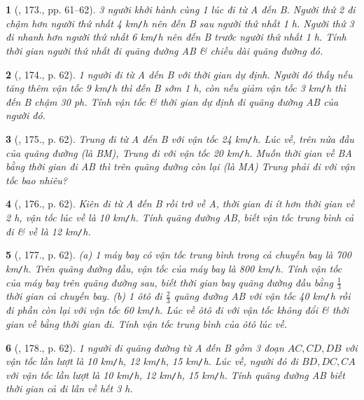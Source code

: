 \documentclass{article}
\newtheorem{baitoan}{}
\begin{document}
\begin{baitoan}[\cite{Binh_Toan_6_tap_2}, 173., pp. 61--62]
	3 người khởi hành cùng 1 lúc đi từ A đến B. Người thứ 2 đi chậm hơn người thứ nhất {\rm4 km{\tt/}h} nên đến B sau người thứ nhất {\rm1 h}. Người thứ 3 đi nhanh hơn người thứ nhất {\rm6 km{\tt/}h} nên đến B trước người thứ nhất {\rm1 h}. Tính thời gian người thứ nhất đi quãng đường AB \& chiều dài quãng đường đó.
\end{baitoan}

\begin{baitoan}[\cite{Binh_Toan_6_tap_2}, 174., p. 62]
	1 người đi từ A dến B với thời gian dự định. Người đó thấy nếu tăng thêm vận tốc {\rm9 km{\tt/}h} thì đến B sớm {\rm1 h}, còn nếu giảm vận tốc {\rm3 km{\tt/}h} thì đến B chậm {\rm30 ph}. Tính vận tốc \& thời gian dự định đi quãng đường AB của người đó.
\end{baitoan}

\begin{baitoan}[\cite{Binh_Toan_6_tap_2}, 175., p. 62]
	Trung đi từ A đến B với vận tốc {\rm24 km{\tt/}h}. Lúc về, trên nửa đầu của quãng đường (là BM), Trung đi với vận tốc {\rm20 km{\tt/}h}. Muốn thời gian về BA bằng thời gian đi AB thì trên quãng đường còn lại (là MA) Trung phải đi với vận tốc bao nhiêu?
\end{baitoan}

\begin{baitoan}[\cite{Binh_Toan_6_tap_2}, 176., p. 62]
	Kiên đi từ A đến B rồi trở về A, thời gian đi ít hơn thời gian về {\rm2 h}, vận tốc lúc về là {\rm10 km{\tt/}h}. Tính quãng đường AB, biết vận tốc trung bình cả đi \& về là {\rm12 km{\tt/}h}.
\end{baitoan}

\begin{baitoan}[\cite{Binh_Toan_6_tap_2}, 177., p. 62]
	(a) 1 máy bay có vận tốc trung bình trong cả chuyến bay là {\rm700 km{\tt/}h}. Trên quãng đường đầu, vận tốc của máy bay là {\rm800 km{\tt/}h}. Tính vận tốc của máy bay trên quãng đường sau, biết thời gian bay quãng đường đầu bằng $\frac{1}{3}$ thời gian cả chuyến bay. (b) 1 ôtô đi $\frac{2}{3}$ quãng đường AB với vận tốc {\rm40 km{\tt/}h} rồi đi phần còn lại với vận tốc {\rm60 km{\tt/}h}. Lúc về ôtô đi với vận tốc không đổi \& thời gian về bằng thời gian đi. Tính vận tốc trung bình của ôtô lúc về.
\end{baitoan}

\begin{baitoan}[\cite{Binh_Toan_6_tap_2}, 178., p. 62]
	1 người đi quãng đường từ A đến B gồm 3 đoạn $AC,CD,DB$ với vận tốc lần lượt là {\rm10 km{\tt/}h, 12 km{\tt/}h, 15 km{\tt/}h}. Lúc về, người đó đi $BD,DC,CA$ với vận tốc lần lượt là {\rm10 km{\tt/}h, 12 km{\tt/}h, 15 km{\tt/}h}. Tính quãng đường AB biết thời gian cả đi lẫn về hết {\rm3 h}.
\end{baitoan}
\end{document}
